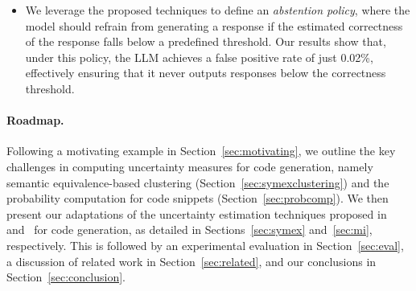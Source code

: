 \begin{itemize}[leftmargin=*]
    \item We leverage the proposed techniques to define an \emph{abstention policy}, where the model should refrain from generating a response if the estimated correctness of the response falls below a predefined threshold. 
    Our results show that, under this policy, the LLM achieves a false positive rate of just 0.02\%, effectively ensuring that it never outputs responses below the correctness threshold.


\end{itemize}

\paragraph{Roadmap.}

Following a motivating example in Section~\ref{sec:motivating}, we outline the key challenges in computing uncertainty measures for code generation, namely semantic equivalence-based clustering (Section~\ref{sec:symexclustering}) and the probability computation for code snippets (Section~\ref{sec:probcomp}). 
We then present our adaptations of the uncertainty estimation techniques proposed in~\cite{kuhnsemantic} and~\cite{abbasi2024believe} for code generation, as detailed in Sections~\ref{sec:symex} and~\ref{sec:mi}, respectively. 
This is followed by an experimental evaluation in Section~\ref{sec:eval}, a discussion of related work in Section~\ref{sec:related}, and our conclusions in Section~\ref{sec:conclusion}.



